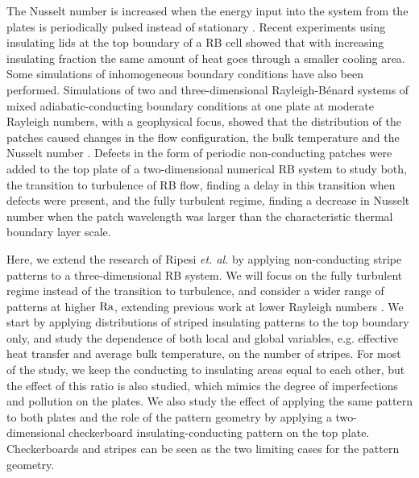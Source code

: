 The Nusselt number is increased when the energy input
into the system from the plates is periodically pulsed instead of stationary
\citep{Jin2008}.
Recent experiments using insulating lids at the top
boundary of a RB cell showed that with increasing insulating fraction the same
amount of heat goes through a smaller cooling area\citep{Wang2017}.   Some
simulations of inhomogeneous boundary conditions have also been
performed.
Simulations of two and three-dimensional
Rayleigh-B\'enard systems of mixed adiabatic-conducting boundary
conditions at one plate at moderate Rayleigh numbers, with a
geophysical focus, showed that the distribution of the patches caused
changes in the flow configuration, the bulk temperature and the
Nusselt number \citep{Cooper2013}.
Defects in the form of periodic non-conducting patches were added to the top
plate of a two-dimensional numerical RB system \citep{Ripesi2014} to
study both, the transition to turbulence of RB flow, finding a delay in this
transition when defects were present, and the fully turbulent regime, finding
a decrease in Nusselt number when the patch wavelength was larger than the
characteristic thermal boundary layer scale. 

Here, we extend the research of Ripesi \textit{et. al.} by applying non-conducting stripe
patterns to a three-dimensional RB system.  We will focus on the fully
turbulent regime instead of the transition to turbulence,
and consider a wider range of patterns at higher $\text{Ra}$, extending 
previous work at lower Rayleigh numbers \citep{Cooper2013}.  We start by
applying distributions of striped insulating patterns to the top boundary
only, and study the dependence of both local and global variables, e.g.
effective heat transfer and average bulk temperature, on the number of
stripes.  For most of the study, we keep the conducting to insulating areas
equal to each other, but the effect of this ratio is also studied, which
mimics the degree of imperfections and pollution on the plates.  We also study
the effect of applying the same pattern to both plates and the role of the
pattern geometry by applying a two-dimensional checkerboard
insulating-conducting pattern on the top plate. Checkerboards and stripes can
be seen as the two limiting cases for the pattern geometry.

